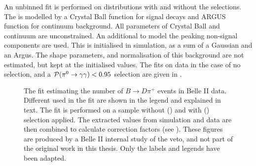 An unbinned \Mbc fit is performed on distributions with and without the \piVeto selections.
The \Mbc is modelled by a Crystal Ball function for signal decays and ARGUS function for continuum background.
All parameters of Crystal Ball and continuum are unconstrained.
An additional \PDF to model the peaking non-signal \BB components are used.
This \PDF is initialised in simulation, as a sum of a Gaussian and an Argus.
The shape parameters, and normalisation of this \BB background \PDF are not estimated, but kept at the initialised values.
The fits on data in the case of no \piVeto selection, and a ${\mathcal{P}(\pi^0\rightarrow\gamma\gamma)}<0.95$ selection are given in .
\begin{figure}[htbp!]
    \centering
    \caption{\label{fig:pivetofit} The fit estimating the number of $B\to D \pi^+$ events in Belle II data.
    Different  used in the fit are shown in the legend and explained in text.
    The fit is performed on a sample without () and with () \piVeto selection applied.
    The extracted values from simulation and data are then combined to calculate \piVeto correction factors (see ).
    These figures are produced by a Belle II internal study of the \piz veto, and not part of the original work in this thesis.
    Only the labels and legends have been adapted.    
    }
\end{figure}

